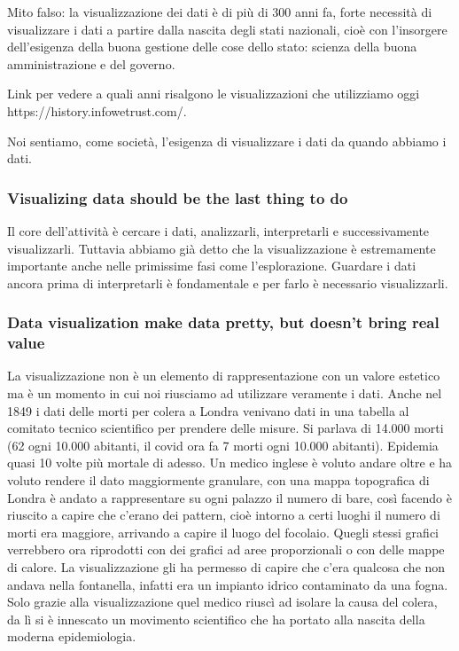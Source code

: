 \documentclass[12pt,a4paper]{report}
\begin{document}
Mito falso: la visualizzazione dei dati è di più di 300 anni fa, forte necessità di visualizzare i dati a partire dalla nascita degli stati nazionali, cioè con l'insorgere dell'esigenza della buona gestione delle cose dello stato: scienza della buona amministrazione e del governo. 
 
Link per vedere a quali anni risalgono le visualizzazioni che utilizziamo oggi https://history.infowetrust.com/. 

Noi sentiamo, come società, l'esigenza di visualizzare i dati da quando abbiamo i dati. 

\subsubsection{Visualizing data should be the last thing to do}

Il core dell'attività è cercare i dati, analizzarli, interpretarli e successivamente visualizzarli. Tuttavia abbiamo già detto che la visualizzazione è estremamente importante anche nelle primissime fasi come l'esplorazione. Guardare i dati ancora prima di interpretarli è fondamentale e per farlo è necessario visualizzarli. 


\subsubsection{Data visualization make data pretty, but doesn't bring real value}

La visualizzazione non è un elemento di rappresentazione con un valore estetico ma è un momento in cui noi riusciamo ad utilizzare veramente i dati. Anche nel 1849 i dati delle morti per colera a Londra venivano dati in una  tabella al comitato tecnico scientifico per prendere delle misure. Si parlava di 14.000 morti (62 ogni 10.000 abitanti, il covid ora fa 7 morti ogni 10.000 abitanti). Epidemia quasi 10 volte più mortale di adesso. Un medico inglese è voluto andare oltre e ha voluto rendere il dato maggiormente granulare, con una mappa topografica di Londra è andato a rappresentare su ogni palazzo il numero di bare, così facendo è riuscito a capire che c'erano dei pattern, cioè intorno a certi luoghi il numero di morti era maggiore, arrivando a capire il luogo del focolaio. Quegli stessi grafici verrebbero ora riprodotti con dei grafici ad aree proporzionali o con delle mappe di calore. La visualizzazione gli ha permesso di capire che c'era qualcosa che non andava nella fontanella, infatti era un impianto idrico contaminato da una fogna. Solo grazie alla visualizzazione quel medico riuscì ad isolare la causa del colera, da lì si è innescato un movimento scientifico che ha portato alla nascita della moderna epidemiologia. 
\end{document}
